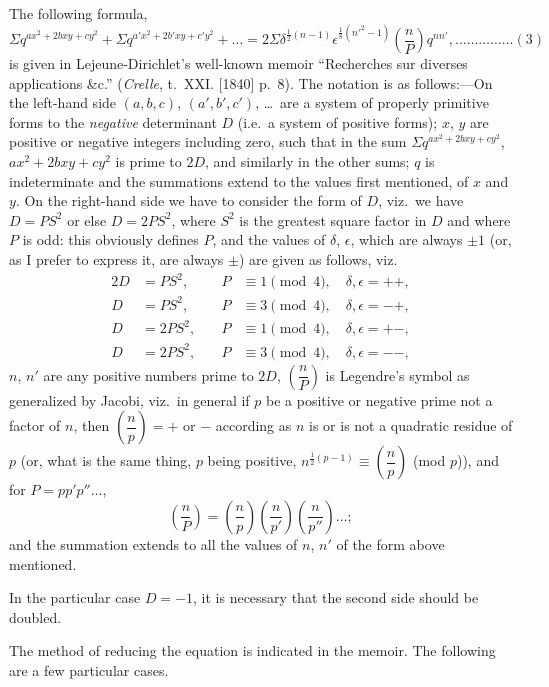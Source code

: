 \documentclass[11pt,a4paper]{book}
\begin{document}
The following formula,
\[
\Sigma q^{ax^2 + 2bxy + cy^2} + \Sigma q^{a'x^2 + 2b'xy + c'y^2} + \ldots
= 2\Sigma \delta^{\frac{1}{2}(n-1)} \epsilon^{\frac{1}{8}(n'^2-1)} \left(\frac{n}{P}\right) q^{nn'},\ldots\ldots\ldots\ldots\ldots(3)
\]
is given in Lejeune-Dirichlet's well-known memoir ``Recherches sur diverses applications \&c.'' (\textit{Crelle}, t.~XXI. [1840] p.~8). The notation is as follows:---On the left-hand side $(a, b, c)$, $(a', b', c')$, \ldots\ are a system of properly primitive forms to the \textit{negative} determinant $D$ (i.e.\ a system of positive forms); $x$, $y$ are positive or negative integers including zero, such that in the sum $\Sigma q^{ax^2 + 2bxy + cy^2}$, $ax^2 + 2bxy + cy^2$ is prime to $2D$, and similarly in the other sums; $q$ is indeterminate and the summations extend to the values first mentioned, of $x$ and $y$. On the right-hand side we have to consider the form of $D$, viz.\ we have $D = PS^2$ or else $D = 2PS^2$, where $S^2$ is the greatest square factor in $D$ and where $P$ is odd: this obviously defines $P$, and the values of $\delta$, $\epsilon$, which are always $\pm 1$ (or, as I prefer to express it, are always $\pm$) are given as follows, viz.
\begin{alignat*}{2}
D &= PS^2, &\quad P &\equiv 1 \pmod{4}, \quad \delta, \epsilon = ++,\\
D &= PS^2, &\quad P &\equiv 3 \pmod{4}, \quad \delta, \epsilon = -+,\\
D &= 2PS^2, &\quad P &\equiv 1 \pmod{4}, \quad \delta, \epsilon = +-,\\
D &= 2PS^2, &\quad P &\equiv 3 \pmod{4}, \quad \delta, \epsilon = --,
\end{alignat*}
$n$, $n'$ are any positive numbers prime to $2D$, $\left(\dfrac{n}{P}\right)$ is Legendre's symbol as generalized by Jacobi, viz.\ in general if $p$ be a positive or negative prime not a factor of $n$, then $\left(\dfrac{n}{p}\right) = +$ or $-$ according as $n$ is or is not a quadratic residue of $p$ (or, what is the same thing, $p$ being positive, $n^{\frac{1}{2}(p-1)} \equiv \left(\dfrac{n}{p}\right)$ (mod $p$)), and for $P = pp'p''\ldots$,
\[
\left(\frac{n}{P}\right) = \left(\frac{n}{p}\right)\left(\frac{n}{p'}\right)\left(\frac{n}{p''}\right)\ldots;
\]
and the summation extends to all the values of $n$, $n'$ of the form above mentioned.

In the particular case $D = -1$, it is necessary that the second side should be doubled.

The method of reducing the equation is indicated in the memoir. The following are a few particular cases.
\end{document}
